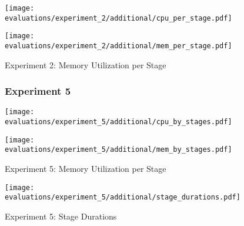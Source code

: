 \begin{figure}[p]
    \begin{adjustwidth}{-0.2\paperwidth}{-0.2\paperwidth}
        \centering
        \texttt{[image: evaluations/experiment\_2/additional/cpu\_per\_stage.pdf]}
        \caption{Experiment 2: CPU Utilization per Stage}
        \label{fig:eval_2_cpu_per_stage}
    \end{adjustwidth}

    \begin{adjustwidth}{-0.2\paperwidth}{-0.2\paperwidth}
        \centering
        \texttt{[image: evaluations/experiment\_2/additional/mem\_per\_stage.pdf]}
        \caption{Experiment 2: Memory Utilization per Stage}
        \label{fig:eval_2_memory_per_stage}
    \end{adjustwidth}
\end{figure}


\begin{figure}[p]
    \subsubsection{Experiment 5}

    \begin{adjustwidth}{-0.2\paperwidth}{-0.2\paperwidth}
        \centering
        \texttt{[image: evaluations/experiment\_5/additional/cpu\_by\_stages.pdf]}
        \caption{Experiment 5: CPU Utilization per Stage}
        \label{fig:eval_5_cpu_per_stage}
    \end{adjustwidth}

    \begin{adjustwidth}{-0.2\paperwidth}{-0.2\paperwidth}
        \centering
        \texttt{[image: evaluations/experiment\_5/additional/mem\_by\_stages.pdf]}
        \caption{Experiment 5: Memory Utilization per Stage}
        \label{fig:eval_5_memory_per_stage}
    \end{adjustwidth}
\end{figure}

\begin{figure}[H]
    \centering
    \begin{adjustwidth}{-0.2\paperwidth}{-0.2\paperwidth}
        \centering
        \texttt{[image: evaluations/experiment\_5/additional/stage\_durations.pdf]}
        \caption{Experiment 5: Stage Durations}
        \label{fig:eval_5_stage_durations}
    \end{adjustwidth}
\end{figure}

